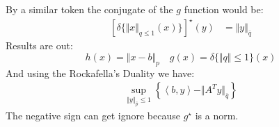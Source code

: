 \documentclass[]{article}
\begin{document}
        By a similar token the conjugate of the $g$ function would be: 
        \begin{align*}\tag{4.2.2.6}\label{eqn:4.2.2.6}
            \left[
                \delta \{
                    \Vert x\Vert_{q \le 1}(x)
                \}
            \right]^\star(y) &= \Vert y\Vert_{\bar{q}}
        \end{align*}
        Results are out: 
        $$
            h(x) = \Vert x - b\Vert_p \quad g(x) = \delta \{\Vert q\Vert \le 1\}(x)
        $$
        And using the Rockafella's Duality we have: 
        \begin{align*}\tag{4.2.2.7}\label{eqn:4.2.2.7}
            \sup_{\Vert y\Vert_{\bar{p}}\le 1} 
            \left\lbrace
                \left\langle b, y \right\rangle - \Vert A^Ty\Vert_{\bar{q}}
            \right\rbrace
        \end{align*}
        The negative sign can get ignore because $g^\star$ is a norm. 
\end{document}

